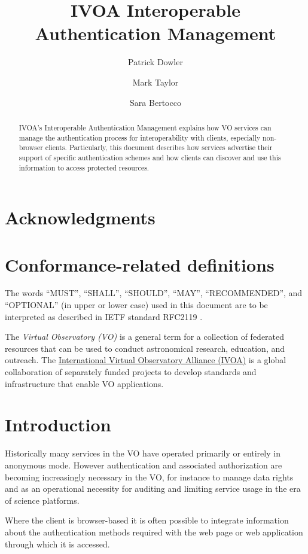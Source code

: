 \documentclass[11pt,a4paper]{ivoa}
\title{IVOA Interoperable Authentication Management}
\author{Patrick Dowler}
\author{Mark Taylor}
\author{Sara Bertocco}
\begin{document}
\begin{abstract}
IVOA's Interoperable Authentication Management explains how
VO services can manage the authentication process for
interoperability with clients, especially non-browser clients.
Particularly, this document
describes how services advertise their
support of specific authentication schemes and how
clients can discover and use this information to access protected
resources.
\end{abstract}


\section*{Acknowledgments}


\section*{Conformance-related definitions}

The words ``MUST'', ``SHALL'', ``SHOULD'', ``MAY'', ``RECOMMENDED'', and
``OPTIONAL'' (in upper or lower case) used in this document are to be
interpreted as described in IETF standard RFC2119 \citep{std:RFC2119}.

The \emph{Virtual Observatory (VO)} is a
general term for a collection of federated resources that can be used
to conduct astronomical research, education, and outreach.
The \href{https://www.ivoa.net}{International
Virtual Observatory Alliance (IVOA)} is a global
collaboration of separately funded projects to develop standards and
infrastructure that enable VO applications.


\section{Introduction}\label{sec:intro}

Historically many services in the VO have operated primarily or
entirely in anonymous mode.
However authentication and associated authorization
are becoming increasingly necessary in the VO,
for instance to manage data rights and as an operational necessity for
auditing and limiting service usage in the era of science platforms.

Where the client is browser-based
it is often possible to integrate information about the authentication
methods required with the web page or web application through which
it is accessed.
\end{document}
